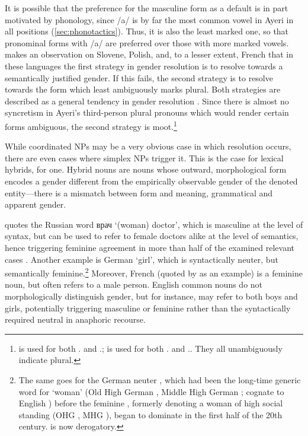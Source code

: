 It is possible that the preference for the masculine form as a default is in
part motivated by phonology, since /a/ is by far the most common vowel in Ayeri
in all positions (\autoref{sec:phonotactics}). Thus, it is also the least
marked one, so that pronominal forms with /a/ are preferred over those with
more marked vowels. \citet{corbett1983} makes an observation on Slovene,
Polish, and, to a lesser extent, French that in these languages the first
strategy in gender resolution is to resolve towards a semantically justified
gender. If this fails, the second strategy is to resolve towards the form which
least ambiguously marks plural. Both strategies are described as a general
tendency in gender resolution \citep[205]{corbett1983}. Since there is almost
no syncretism in Ayeri's third-person plural pronouns which would render
certain forms ambiguous, the second strategy is
moot.\footnote{ is used for both \TplF{}.\Aarg{} and
\TplI{}.\Aarg{};  is used for both
\TplF{}.\Gen{} and \TplI{}.\Gen{}. They all unambiguously indicate plural.}


While coordinated NPs may be a very obvious case in which resolution occurs,
there are even cases where simplex NPs trigger it. This is the case for lexical
hybrids, for one. Hybrid nouns are nouns whose outward, morphological form
encodes a gender different from the empirically observable gender of the
denoted entity---there is a mismatch between form and meaning, grammatical and
apparent gender.

\citet{corbett2006} quotes the Russian word {\FS врач}
 `(woman) doctor', which is masculine at the level of syntax, but can
be used to refer to female doctors alike at the level of semantics, hence
triggering feminine agreement in more than half of the examined relevant cases
\citep[158]{corbett2006}. Another example is German  `girl',
which is syntactically neuter, but semantically feminine.\footnote{The same
goes for the German neuter  \parencite[compare][165--166]
{fleischer2012}, which had been the long-time generic word for `woman' (Old
High German , Middle High German ; cognate to English
) before the feminine , formerly denoting a woman of high
social standing (OHG , MHG ), began to dominate in the
first half of the 20th century.  is now derogatory.} Moreover, French
 (quoted by \cite{wechsler2009} as an example) is a feminine
noun, but often refers to a male person. English common nouns do not
morphologically distinguish gender, but for instance,  may refer to
both boys and girls, potentially triggering masculine  or feminine
 rather than the syntactically required neutral  in anaphoric
recourse.

